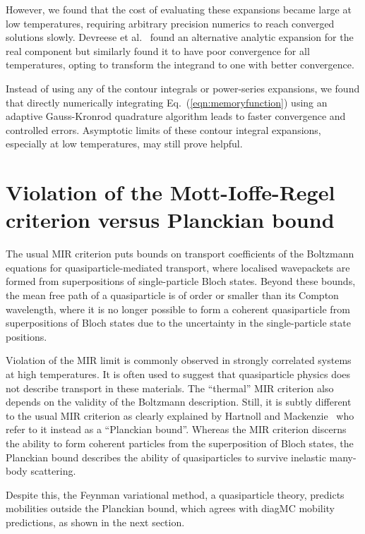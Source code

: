 However, we found that the cost of evaluating these expansions became large at low temperatures, requiring arbitrary precision numerics to reach converged solutions slowly. Devreese et al.~\cite{devreese_optical_1972} found an alternative analytic expansion for the real component but similarly found it to have poor convergence for all temperatures, opting to transform the integrand to one with better convergence. 

Instead of using any of the contour integrals or power-series expansions, we found that directly numerically integrating Eq.~(\ref{eqn:memoryfunction}) using an adaptive Gauss-Kronrod quadrature algorithm leads to faster convergence and controlled errors. Asymptotic limits of these contour integral expansions, especially at low temperatures, may still prove helpful.

\section{Violation of the Mott-Ioffe-Regel criterion versus Planckian bound}

The usual MIR criterion puts bounds on transport coefficients of the Boltzmann equations for quasiparticle-mediated transport, where localised wavepackets are formed from superpositions of single-particle Bloch states. Beyond these bounds, the mean free path of a quasiparticle is of order or smaller than its Compton wavelength, where it is no longer possible to form a coherent quasiparticle from superpositions of Bloch states due to the uncertainty in the single-particle state positions.

Violation of the MIR limit is commonly observed in strongly correlated systems at high temperatures. It is often used to suggest that quasiparticle physics does not describe transport in these materials. The ``thermal'' MIR criterion also depends on the validity of the Boltzmann description. Still, it is subtly different to the usual MIR criterion as clearly explained by Hartnoll and Mackenzie~\cite{mousatov_planckian_2020, hartnoll_colloquium_2022} who refer to it instead as a ``Planckian bound''. Whereas the MIR criterion discerns the ability to form coherent particles from the superposition of Bloch states, the Planckian bound describes the ability of quasiparticles to survive inelastic many-body scattering. 

Despite this, the Feynman variational method, a quasiparticle theory, predicts mobilities outside the Planckian bound, which agrees with diagMC mobility predictions, as shown in the next section.

